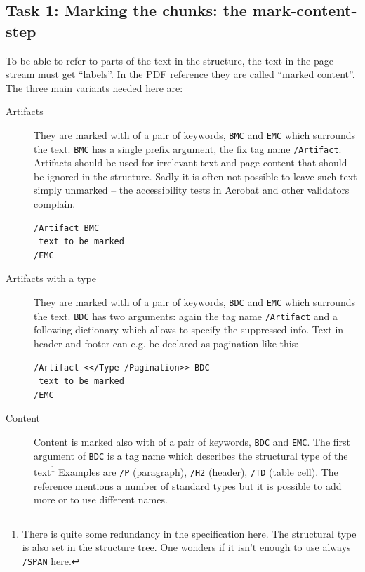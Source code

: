 \documentclass[DIV=12,parskip=half-,bibliography=totoc]{scrartcl}
\newcommand\PDF{PDF}
\begin{document}
\subsection{Task 1: Marking the chunks: the mark-content-step}



To be able to refer to parts of the text in the structure, the text in the page stream must get \enquote{labels}. In the \PDF{} reference they are called \enquote{marked content}. The three main variants needed here are:

\begin{description}
\item[Artifacts] They are marked with of a pair of keywords, \texttt{BMC} and \texttt{EMC} which surrounds the text. \texttt{BMC} has a single prefix argument, the fix tag name \texttt{/Artifact}. Artifacts should be used for irrelevant text and page content that should be ignored in the structure. Sadly it is often not possible to leave such text simply unmarked -- the accessibility tests in Acrobat and other validators complain.


\begin{lstlisting}
/Artifact BMC
 text to be marked
/EMC
\end{lstlisting}





\item[Artifacts with a type]
They are marked with of a pair of keywords, \texttt{BDC} and \texttt{EMC} which surrounds the text. \texttt{BDC} has two arguments: again the tag name \texttt{/Artifact} and a following dictionary which allows to specify the suppressed info. Text in header and footer can e.g. be declared as pagination like this:


\begin{lstlisting}
/Artifact <</Type /Pagination>> BDC
 text to be marked
/EMC
\end{lstlisting}




\item[Content]  Content is marked also with of a pair of keywords, \texttt{BDC} and \texttt{EMC}. The first argument of \texttt{BDC} is a tag name which describes the structural type of the text\tagpdfparaOff\footnote{There is quite some redundancy in the specification here. The structural type is also set in the structure tree. One wonders if it isn't enough to use  always \texttt{/SPAN} here.}\tagpdfparaOn
    Examples are \texttt{/P} (paragraph), \texttt{/H2} (header), \texttt{/TD} (table cell). The reference mentions a number of standard types but it is possible to add more or to use different names.


\end{description}
\end{document}
